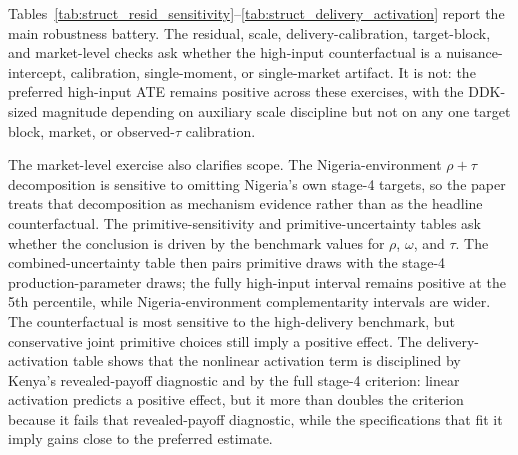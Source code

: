 \documentclass[11pt]{article}
\begin{document}




Tables~\ref{tab:struct_resid_sensitivity}--\ref{tab:struct_delivery_activation} report the main robustness battery. The residual, scale, delivery-calibration, target-block, and market-level checks ask whether the high-input counterfactual is a nuisance-intercept, calibration, single-moment, or single-market artifact. It is not: the preferred high-input ATE remains positive across these exercises, with the DDK-sized magnitude depending on auxiliary scale discipline but not on any one target block, market, or observed-$\tau$ calibration.

The market-level exercise also clarifies scope. The Nigeria-environment $\rho+\tau$ decomposition is sensitive to omitting Nigeria's own stage-4 targets, so the paper treats that decomposition as mechanism evidence rather than as the headline counterfactual. The primitive-sensitivity and primitive-uncertainty tables ask whether the conclusion is driven by the benchmark values for $\rho$, $\omega$, and $\tau$. The combined-uncertainty table then pairs primitive draws with the stage-4 production-parameter draws; the fully high-input interval remains positive at the 5th percentile, while Nigeria-environment complementarity intervals are wider. The counterfactual is most sensitive to the high-delivery benchmark, but conservative joint primitive choices still imply a positive effect. The delivery-activation table shows that the nonlinear activation term is disciplined by Kenya's revealed-payoff diagnostic and by the full stage-4 criterion: linear activation predicts a positive effect, but it more than doubles the criterion because it fails that revealed-payoff diagnostic, while the specifications that fit it imply gains close to the preferred estimate.












\end{document}
